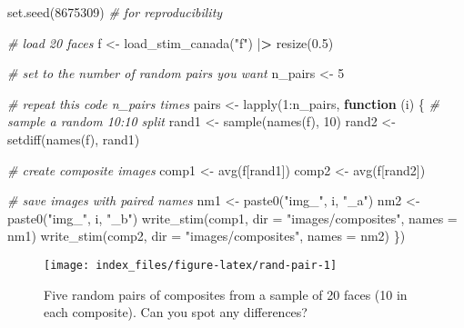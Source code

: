\documentclass[
  doc,floatsintext]{apa6}
\newenvironment{Shaded}{\begin{snugshade}}{\end{snugshade}}
\newcommand{\AttributeTok}[1]{\textcolor[rgb]{0.77,0.63,0.00}{#1}}
\newcommand{\CommentTok}[1]{\textcolor[rgb]{0.56,0.35,0.01}{\textit{#1}}}
\newcommand{\ControlFlowTok}[1]{\textcolor[rgb]{0.13,0.29,0.53}{\textbf{#1}}}
\newcommand{\DecValTok}[1]{\textcolor[rgb]{0.00,0.00,0.81}{#1}}
\newcommand{\ErrorTok}[1]{\textcolor[rgb]{0.64,0.00,0.00}{\textbf{#1}}}
\newcommand{\FloatTok}[1]{\textcolor[rgb]{0.00,0.00,0.81}{#1}}
\newcommand{\FunctionTok}[1]{\textcolor[rgb]{0.00,0.00,0.00}{#1}}
\newcommand{\NormalTok}[1]{#1}
\newcommand{\OtherTok}[1]{\textcolor[rgb]{0.56,0.35,0.01}{#1}}
\newcommand{\SpecialCharTok}[1]{\textcolor[rgb]{0.00,0.00,0.00}{#1}}
\newcommand{\StringTok}[1]{\textcolor[rgb]{0.31,0.60,0.02}{#1}}
\begin{document}
\begin{Shaded}
\begin{Highlighting}[]
\FunctionTok{set.seed}\NormalTok{(}\DecValTok{8675309}\NormalTok{) }\CommentTok{\# for reproducibility}

\CommentTok{\# load 20 faces}
\NormalTok{f }\OtherTok{\textless{}{-}} \FunctionTok{load\_stim\_canada}\NormalTok{(}\StringTok{"f"}\NormalTok{) }\SpecialCharTok{|}\ErrorTok{\textgreater{}} \FunctionTok{resize}\NormalTok{(}\FloatTok{0.5}\NormalTok{)}

\CommentTok{\# set to the number of random pairs you want}
\NormalTok{n\_pairs }\OtherTok{\textless{}{-}} \DecValTok{5}

\CommentTok{\# repeat this code n\_pairs times}
\NormalTok{pairs }\OtherTok{\textless{}{-}} \FunctionTok{lapply}\NormalTok{(}\DecValTok{1}\SpecialCharTok{:}\NormalTok{n\_pairs, }\ControlFlowTok{function}\NormalTok{ (i) \{}
  \CommentTok{\# sample a random 10:10 split}
\NormalTok{  rand1 }\OtherTok{\textless{}{-}} \FunctionTok{sample}\NormalTok{(}\FunctionTok{names}\NormalTok{(f), }\DecValTok{10}\NormalTok{)}
\NormalTok{  rand2 }\OtherTok{\textless{}{-}} \FunctionTok{setdiff}\NormalTok{(}\FunctionTok{names}\NormalTok{(f), rand1)}
  
  \CommentTok{\# create composite images}
\NormalTok{  comp1 }\OtherTok{\textless{}{-}} \FunctionTok{avg}\NormalTok{(f[rand1])}
\NormalTok{  comp2 }\OtherTok{\textless{}{-}} \FunctionTok{avg}\NormalTok{(f[rand2])}
  
  \CommentTok{\# save images with paired names}
\NormalTok{  nm1 }\OtherTok{\textless{}{-}} \FunctionTok{paste0}\NormalTok{(}\StringTok{"img\_"}\NormalTok{, i, }\StringTok{"\_a"}\NormalTok{)}
\NormalTok{  nm2 }\OtherTok{\textless{}{-}} \FunctionTok{paste0}\NormalTok{(}\StringTok{"img\_"}\NormalTok{, i, }\StringTok{"\_b"}\NormalTok{)}
  \FunctionTok{write\_stim}\NormalTok{(comp1, }\AttributeTok{dir =} \StringTok{"images/composites"}\NormalTok{, }\AttributeTok{names =}\NormalTok{ nm1)}
  \FunctionTok{write\_stim}\NormalTok{(comp2, }\AttributeTok{dir =} \StringTok{"images/composites"}\NormalTok{, }\AttributeTok{names =}\NormalTok{ nm2)}
\NormalTok{\})}
\end{Highlighting}
\end{Shaded}

\begin{figure}
\texttt{[image: index\_files/figure-latex/rand-pair-1]} \caption{Five random pairs of composites from a sample of 20 faces (10 in each composite). Can you spot any differences?}\label{fig:rand-pair}
\end{figure}
\end{document}
